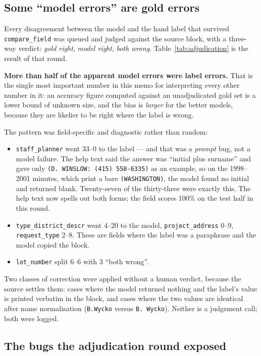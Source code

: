 \documentclass[11pt]{article}
\begin{document}
\subsection{Some ``model errors'' are gold errors}
\label{sec:golderrors}
\label{sec:adjudication}

Every disagreement between the model and the hand label that survived \texttt{compare\_field}
was queued and judged against the source block, with a three-way verdict: \emph{gold right},
\emph{model right}, \emph{both wrong}. Table~\ref{tab:adjudication} is the result of that
round.

\textbf{More than half of the apparent model errors were label errors.} That is the single
most important number in this memo for interpreting every other number in it: an accuracy
figure computed against an unadjudicated gold set is a lower bound of unknown size, and the
bias is \emph{larger} for the better models, because they are likelier to be right where the
label is wrong.

The pattern was field-specific and diagnostic rather than random:

\begin{itemize}
\item \texttt{staff\_planner} went 33--0 to the label --- and that was a \emph{prompt} bug,
not a model failure. The help text said the answer was ``initial plus surname'' and gave only
\texttt{(D. WINSLOW: (415) 558-6335)} as an example, so on the 1998--2001 minutes, which
print a bare \texttt{(WASHINGTON)}, the model found no initial and returned blank. Twenty-seven
of the thirty-three were exactly this. The help text now spells out both forms; the field
scores 100\% on the test half in this round.
\item \texttt{type\_district\_descr} went 4--20 to the model, \texttt{project\_address} 0--9,
\texttt{request\_type} 2--8. These are fields where the label was a paraphrase and the model
copied the block.
\item \texttt{lot\_number} split 6--6 with 3 ``both wrong''.
\end{itemize}

Two classes of correction were applied without a human verdict, because the source settles
them: cases where the model returned nothing and the label's value is printed verbatim in the
block, and cases where the two values are identical after name normalisation
(\texttt{B.Wycko} versus \texttt{B. Wycko}). Neither is a judgement call; both were logged.

\subsection{The bugs the adjudication round exposed}
\end{document}
